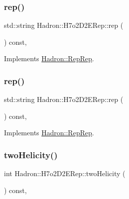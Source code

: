 \subsubsection{\texorpdfstring{rep()}{rep()}\hspace{0.1cm}{\footnotesize\ttfamily [2/3]}}
{\footnotesize\ttfamily std\+::string Hadron\+::\+H7o2\+D2\+E\+Rep\+::rep (\begin{DoxyParamCaption}{ }\end{DoxyParamCaption}) const\hspace{0.3cm}{\ttfamily [inline]}, {\ttfamily [virtual]}}



Implements \mbox{\hyperlink{structHadron_1_1RepRep_ab3213025f6de249f7095892109575fde}{Hadron\+::\+Rep\+Rep}}.

\mbox{\label{structHadron_1_1H7o2D2ERep_abd5db7339f3bf5e389260db649418d0d}} 
\subsubsection{\texorpdfstring{rep()}{rep()}\hspace{0.1cm}{\footnotesize\ttfamily [3/3]}}
{\footnotesize\ttfamily std\+::string Hadron\+::\+H7o2\+D2\+E\+Rep\+::rep (\begin{DoxyParamCaption}{ }\end{DoxyParamCaption}) const\hspace{0.3cm}{\ttfamily [inline]}, {\ttfamily [virtual]}}



Implements \mbox{\hyperlink{structHadron_1_1RepRep_ab3213025f6de249f7095892109575fde}{Hadron\+::\+Rep\+Rep}}.

\mbox{\label{structHadron_1_1H7o2D2ERep_ab74ff7de742966a259984e56abc8dc12}} 
\subsubsection{\texorpdfstring{twoHelicity()}{twoHelicity()}\hspace{0.1cm}{\footnotesize\ttfamily [1/2]}}
{\footnotesize\ttfamily int Hadron\+::\+H7o2\+D2\+E\+Rep\+::two\+Helicity (\begin{DoxyParamCaption}{ }\end{DoxyParamCaption}) const\hspace{0.3cm}{\ttfamily [inline]}, {\ttfamily [virtual]}}

